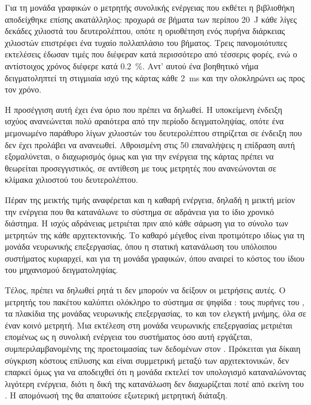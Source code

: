Για τη μονάδα γραφικών ο μετρητής συνολικής ενέργειας που εκθέτει η βιβλιοθήκη
 αποδείχθηκε επίσης ακατάλληλος: προχωρά σε βήματα των περίπου
\qty{20}{\joule} κάθε λίγες δεκάδες χιλιοστά του δευτερολέπτου, οπότε η
οριοθέτηση ενός πυρήνα διάρκειας χιλιοστών επιστρέφει ένα τυχαίο πολλαπλάσιο του
βήματος. Τρεις πανομοιότυπες εκτελέσεις έδωσαν τιμές που διέφεραν κατά
περισσότερο από τέσσερις φορές, ενώ ο αντίστοιχος χρόνος διέφερε κατά \qty{0.2}{\percent}.
Αντ' αυτού ένα βοηθητικό νήμα δειγματοληπτεί τη στιγμιαία ισχύ της κάρτας κάθε
\qty{2}{\milli\second} και την ολοκληρώνει ως προς τον χρόνο.

Η προσέγγιση αυτή έχει ένα όριο που πρέπει να δηλωθεί. Η υποκείμενη ένδειξη
ισχύος ανανεώνεται πολύ αραιότερα από την περίοδο δειγματοληψίας, οπότε ένα
μεμονωμένο παράθυρο  λίγων χιλιοστών του δευτερολέπτου στηρίζεται σε
ένδειξη που δεν έχει προλάβει να ανανεωθεί. Αθροισμένη στις 50 επαναλήψεις η
επίδραση αυτή εξομαλύνεται, ο διαχωρισμός όμως  και  για
την ενέργεια της κάρτας πρέπει να θεωρείται προσεγγιστικός, σε αντίθεση με τους
μετρητές  που ανανεώνονται σε κλίμακα χιλιοστού του δευτερολέπτου.

Πέραν της μεικτής τιμής αναφέρεται και η καθαρή ενέργεια, δηλαδή η μεικτή μείον
την ενέργεια που θα κατανάλωνε το σύστημα σε αδράνεια για το ίδιο χρονικό
διάστημα. Η ισχύς αδράνειας μετριέται πριν από κάθε σάρωση για το σύνολο των
μετρητών της κάθε αρχιτεκτονικής. Το καθαρό μέγεθος είναι προτιμότερο ιδίως για
τη μονάδα νευρωνικής επεξεργασίας, όπου η στατική κατανάλωση του υπόλοιπου
συστήματος κυριαρχεί, και για τη μονάδα γραφικών, όπου αναιρεί το κόστος του
ίδιου του μηχανισμού δειγματοληψίας.

Τέλος, πρέπει να δηλωθεί ρητά τι δεν μπορούν να δείξουν οι μετρήσεις αυτές. Ο
μετρητής του πακέτου καλύπτει ολόκληρο το σύστημα σε ψηφίδα : 
τους πυρήνες του , τα πλακίδια της μονάδας νευρωνικής επεξεργασίας, το 
 και τον ελεγκτή μνήμης, όλα σε έναν κοινό μετρητή. Μια εκτέλεση στη μονάδα
νευρωνικής επεξεργασίας μετριέται επομένως ως η συνολική ενέργεια του συστήματος
όσο αυτή εργάζεται, συμπεριλαμβανομένης της προετοιμασίας των δεδομένων στον
. Πρόκειται για δίκαιη σύγκριση κόστους επίλυσης και είναι συμμετρική
μεταξύ των αρχιτεκτονικών, δεν επαρκεί όμως για να αποδειχθεί ότι η μονάδα
εκτελεί τον υπολογισμό καταναλώνοντας λιγότερη ενέργεια, διότι η δική της
κατανάλωση δεν διαχωρίζεται ποτέ από εκείνη του . Η απομόνωσή της θα
απαιτούσε εξωτερική μετρητική διάταξη.

